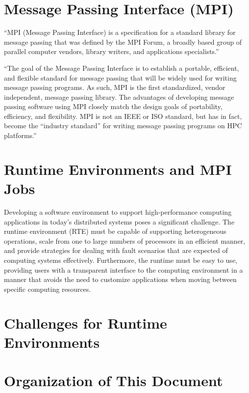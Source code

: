 \section{Message Passing Interface (MPI)}
\label{sec:Introduction}
``MPI (Message Passing Interface) is a specification for a standard library for message passing that was defined by the MPI Forum, a broadly based group of parallel computer vendors, library writers, and applications specialists.''~\cite{gropp1996high}

``The goal of the Message Passing Interface is to establish a portable, efficient, and flexible standard for message passing that will be widely used for writing message passing programs. As such, MPI is the first standardized, vendor independent, message passing library. The advantages of developing message passing software using MPI closely match the design goals of portability, efficiency, and flexibility. MPI is not an IEEE or ISO standard, but has in fact, become the ``industry standard'' for writing message passing programs on HPC platforms.''~\cite{barker2015message}

\section{Runtime Environments and MPI Jobs}
\label{sec:Introduction}
Developing a software environment to support high-performance computing applications in today's distributed systems poses a significant challenge. The runtime environment (RTE) must be capable of supporting heterogeneous operations, scale from one to large numbers of processors in an efficient manner, and provide strategies for dealing with fault scenarios that are expected of computing systems effectively. Furthermore, the runtime must be easy to use, providing users with a transparent interface to the computing environment in a manner that avoids the need to customize applications when moving between specific computing resources.~\cite{Castain2008153}

\section{Challenges for Runtime Environments}
\label{sec:Introduction}


\section{Organization of This Document}
\label{sec:Introduction}

